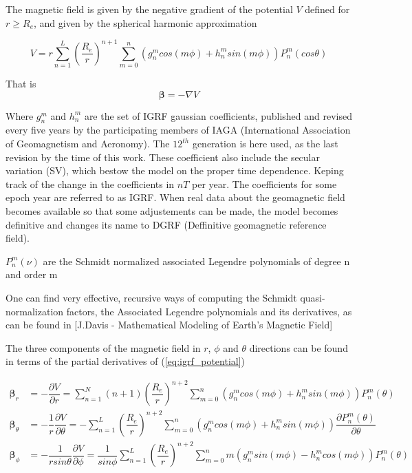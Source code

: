 The magnetic field is given by the negative gradient of the potential $V$ defined for $r \geq R_e$, and given by the spherical harmonic approximation

\begin{equation} \label{eq:igrf_potential}
V = r \sum_{n=1}^{L} \left(\dfrac{R_e}{r}\right)^{n+1} \sum_{m=0}^{n} \left(g_n^m cos(m\phi) + h_n^m sin(m\phi)\right) P_n^m(cos\theta)
\end{equation}

That is
\begin{equation}
{\bm \beta} = -\nabla V
\end{equation}

Where $g_n^m$ and $h_n^m$ are the set of IGRF gaussian coefficients, published and revised every five years by the participating members of IAGA (International Association
of Geomagnetism and Aeronomy). The $12^{th}$ generation is here used, as the last revision by the time of this work. These coefficient also include the secular variation (SV), which bestow the model on the proper time dependence. Keping track of the change in the coefficients in $nT$ per year. The coefficients  for some epoch year are referred to as IGRF. When real data about the geomagnetic field becomes available so that some adjustements can be made, the model becomes definitive and changes its name to DGRF (Deffinitive geomagnetic reference field).

$P_n^m(\nu)$ are the Schmidt normalized associated Legendre polynomials of degree n and order m

One can find very effective, recursive ways of computing the Schmidt quasi-normalization factors, the Associated Legendre polynomials and its derivatives, as can be found in [J.Davis - Mathematical Modeling of Earth’s Magnetic Field] %

The three components of the magnetic field in $r$, $\phi$ and $\theta$ directions can be found in terms of the partial derivatives of (\ref{eq:igrf_potential})


\begin{equation} \label{eq:local_sph_cpmt}
\begin{aligned}
{\bm \beta}_r &= -\dfrac{\partial V}{\partial r} = \sum_{n=1}^{N} (n+1) \left(\dfrac{R_e}{r}\right)^{n+2} \sum_{m=0}^{n} \left(g_n^m cos(m\phi) + h_n^m sin(m\phi)\right) P_n^m(\theta)\\
{\bm \beta}_{\theta} &= -\dfrac{1}{r} \dfrac{\partial V}{\partial \theta} = 
-\sum_{n=1}^{L} \left(\dfrac{R_e}{r}\right)^{n+2} \sum_{m=0}^{n} \left(g_n^m cos(m\phi) + h_n^m sin(m\phi)\right) \dfrac{\partial P_n^m(\theta)}{\partial \theta}\\
{\bm \beta}_{\phi} &= -\dfrac{1}{r sin\theta} \dfrac{\partial V}{\partial \phi} = 
\dfrac{1}{sin\phi}\sum_{n=1}^{L} \left(\dfrac{R_e}{r}\right)^{n+2} \sum_{m=0}^{n} m\left(g_n^m sin(m\phi) - h_n^m cos(m\phi)\right) P_n^m(\theta)
\end{aligned}
\end{equation}



